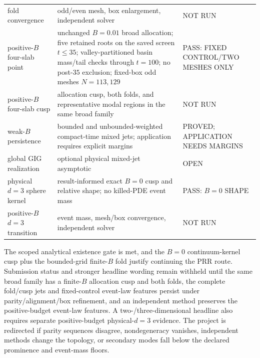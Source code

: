 \documentclass[aps,physrev,reprint,amsmath,amssymb,longbibliography,floatfix]{revtex4-2}
\begin{document}
\begin{table}[t]
\begin{tabular}{p{}p{}p{}}
{\raggedright fold convergence\par} & {\raggedright odd/even mesh, box enlargement, independent solver\par} & {\raggedright NOT RUN\par}\tabularnewline
{\raggedright positive-$B$ four-slab point\par} & {\raggedright unchanged $B=0.01$ broad allocation; five retained roots on the saved screen $t\leq35$; valley-partitioned basin mass/tail checks through $t=100$; no post-$35$ exclusion; fixed-box odd meshes $N=113,129$\par} & {\raggedright PASS: FIXED CONTROL/TWO MESHES ONLY\par}\tabularnewline
{\raggedright positive-$B$ four-slab cusp\par} & {\raggedright allocation cusp, both folds, and representative modal regions in the same broad family\par} & {\raggedright NOT RUN\par}\tabularnewline
{\raggedright weak-$B$ persistence\par} & {\raggedright bounded and unbounded-weighted compact-time mixed jets; application requires explicit margins\par} & {\raggedright PROVED; APPLICATION NEEDS MARGINS\par}\tabularnewline
{\raggedright global GIG realization\par} & {\raggedright optional physical mixed-jet asymptotic\par} & {\raggedright OPEN\par}\tabularnewline
{\raggedright physical $d=3$ sphere kernel\par} & {\raggedright result-informed exact $B=0$ cusp and relative shape; no killed-PDE event mass\par} & {\raggedright PASS: $B=0$ SHAPE\par}\tabularnewline
{\raggedright positive-$B$ $d=3$ transition\par} & {\raggedright event mass, mesh/box convergence, independent solver\par} & {\raggedright NOT RUN\par}\tabularnewline
\bottomrule
\end{tabular}
\end{table}

The scoped analytical existence gate is met, and the $B=0$ continuum-kernel
cusp plus the bounded-grid finite-$B$ fold justify continuing the PRR route.
Submission status and stronger headline wording remain withheld until the
same broad family has a finite-$B$ allocation cusp and both folds, the
complete fold/cusp jets and fixed-control event-law features persist under
parity/alignment/box refinement, and an independent method preserves the
positive-budget event-law features.  A two-/three-dimensional headline also
requires separate positive-budget physical-$d=3$ evidence.  The project is
redirected if parity sequences disagree, nondegeneracy vanishes, independent
methods change the topology, or secondary modes fall below the declared
prominence and event-mass floors.
\end{document}
